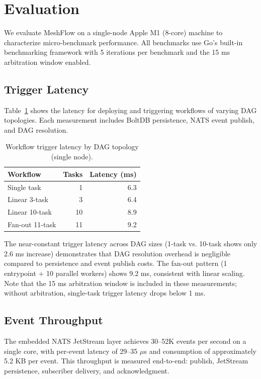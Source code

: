 \section{Evaluation}

We evaluate MeshFlow on a single-node Apple M1 (8-core) machine to characterize micro-benchmark performance. All benchmarks use Go's built-in benchmarking framework with 5 iterations per benchmark and the 15 ms arbitration window enabled.

\subsection{Trigger Latency}

Table~\ref{tab:trigger-latency} shows the latency for deploying and triggering workflows of varying DAG topologies. Each measurement includes BoltDB persistence, NATS event publish, and DAG resolution.

\begin{table}[h]
\centering
\caption{Workflow trigger latency by DAG topology (single node).}
\label{tab:trigger-latency}
\begin{tabular}{lrr}
\toprule
\textbf{Workflow} & \textbf{Tasks} & \textbf{Latency (ms)} \\
\midrule
Single task & 1 & 6.3 \\
Linear 3-task & 3 & 6.4 \\
Linear 10-task & 10 & 8.9 \\
Fan-out 11-task & 11 & 9.2 \\
\bottomrule
\end{tabular}
\end{table}

The near-constant trigger latency across DAG sizes (1-task vs. 10-task shows only 2.6 ms increase) demonstrates that DAG resolution overhead is negligible compared to persistence and event publish costs. The fan-out pattern (1 entrypoint + 10 parallel workers) shows 9.2 ms, consistent with linear scaling. Note that the 15 ms arbitration window is included in these measurements; without arbitration, single-task trigger latency drops below 1 ms.

\subsection{Event Throughput}

The embedded NATS JetStream layer achieves 30--52K events per second on a single core, with per-event latency of 29--35 $\mu$s and consumption of approximately 5.2 KB per event. This throughput is measured end-to-end: publish, JetStream persistence, subscriber delivery, and acknowledgment.

